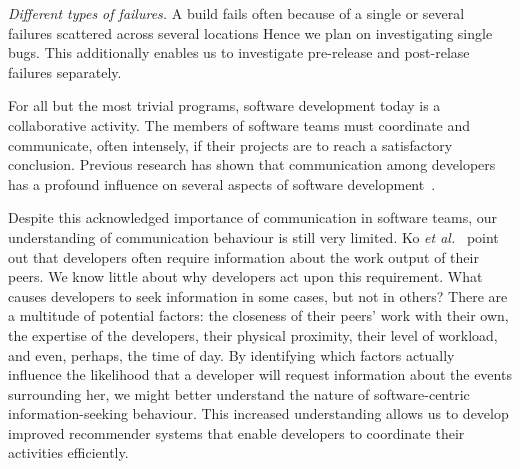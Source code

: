 \emph{Different types of failures.}
A build fails often because of a single or several failures scattered across several locations
Hence we plan on
investigating single bugs. This additionally enables us to investigate pre-release and post-relase failures separately.















\label{chap:talk}

For all but the most trivial programs, software development today is a collaborative activity. The members of software teams must coordinate and communicate, often intensely, if their projects are to reach a satisfactory conclusion.
Previous research has shown that communication among developers has a profound influence on several aspects of software development~\cite{hinds:cscw:2006,wolf:icse:2009}.

Despite this acknowledged importance of communication in software teams, our understanding of communication behaviour is still very limited. Ko \emph{et al.}~\cite{ko:icse:2007} point out that developers often require information about the work output of their peers.  We know little about why developers act upon this requirement. What causes developers to seek information in some cases, but not in others? There are a multitude of potential factors: the closeness of their peers' work with their own, the expertise of the developers, their physical proximity, their level of workload, and even, perhaps, the time of day. By identifying which factors actually influence the likelihood that a developer will request information about the events surrounding her, we might better understand the nature of software-centric information-seeking behaviour. This increased understanding allows us to develop improved recommender systems that enable developers to coordinate their activities efficiently.

